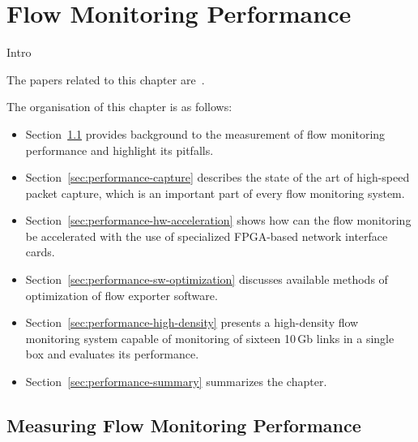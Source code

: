 \chapter{Flow Monitoring Performance}\label{chap:flow-monitoring-performance}

\begin{chapintro}

Intro

The papers related to this chapter are~\cite{Velan-2015-High, Pus-2015-Hardware}.

The organisation of this chapter is as follows:
\begin{itemize}
  \item Section~\ref{sec:performance-measurement} provides background to the measurement of flow monitoring performance and highlight its pitfalls.
  \item Section~\ref{sec:performance-capture} describes the state of the art of high-speed packet capture, which is an important part of every flow monitoring system.
  \item Section~\ref{sec:performance-hw-acceleration} shows how can the flow monitoring be accelerated with the use of specialized FPGA-based network interface cards.
  \item Section~\ref{sec:performance-sw-optimization} discusses available methods of optimization of flow exporter software.
  \item Section~\ref{sec:performance-high-density} presents a high-density flow monitoring system capable of monitoring of sixteen 10\,Gb links in a single box and evaluates its performance.
  \item Section~\ref{sec:performance-summary} summarizes the chapter.
\end{itemize}

\end{chapintro}

\newpage


\section{Measuring Flow Monitoring Performance}\label{sec:performance-measurement}

